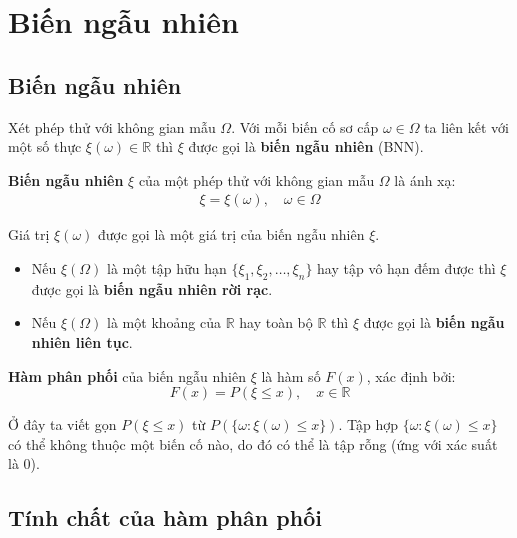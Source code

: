 \documentclass{mynotes}
\newcommand{\RR}{\mathbb{R}}
\begin{document}
\chapter{Biến ngẫu nhiên}

\section{Biến ngẫu nhiên}

Xét phép thử với không gian mẫu $\Omega$. Với mỗi biến cố sơ cấp $\omega \in \Omega$ ta liên kết với một số thực $\xi(\omega) \in \RR$ thì $\xi$ được gọi là \textbf{biến ngẫu nhiên} (BNN).

\begin{definition}
    \textbf{Biến ngẫu nhiên} $\xi$ của một phép thử với không gian mẫu $\Omega$ là ánh xạ: 
    \begin{equation*}
        \begin{split}
            \xi = \xi (\omega), \quad \omega \in \Omega
        \end{split}
    \end{equation*}
\end{definition}
    
Giá trị $\xi(\omega)$ được gọi là một giá trị của biến ngẫu nhiên $\xi$.

\begin{itemize}
    \item Nếu $\xi(\Omega)$ là một tập hữu hạn $\{\xi_1, \xi_2, \ldots,\xi_n\}$ hay tập vô hạn đếm được thì $\xi$ được gọi là \textbf{biến ngẫu nhiên rời rạc}.
    \item Nếu $\xi(\Omega)$ là một khoảng của $\RR$ hay toàn bộ $\RR$ thì $\xi$ được gọi là \textbf{biến ngẫu nhiên liên tục}.
\end{itemize}

\begin{definition}
    \textbf{Hàm phân phối} của biến ngẫu nhiên $\xi$ là hàm số $F(x)$, xác định bởi:
    \begin{equation}
        F(x) = P(\xi \leq x), \quad x \in \RR
    \end{equation}
\end{definition}

Ở đây ta viết gọn $P(\xi \leq x)$ từ $P(\{ \omega: \xi(\omega) \leq x \})$. Tập hợp $\{ \omega: \xi(\omega) \leq x\}$ có thể không thuộc một biến cố nào, do đó có thể là tập rỗng (ứng với xác suất là 0).
\section{Tính chất của hàm phân phối}
\end{document}
